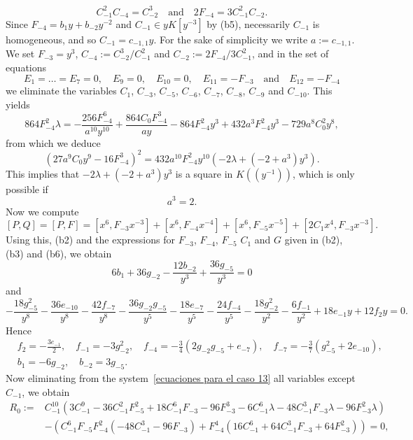 \documentclass[reqno,a4paper]{amsart}
\theoremstyle{definition}
\theoremstyle{remark}
\begin{document}
$$
C_{-1}^2 C_{-4} = C_{-2}^3\quad\text{and}\quad 2 F_{-4} = 3 C_{-1}^2 C_{-2}.
$$
%
Since $F_{-4}= b_1 y + b_{-2} y^{-2}$ and $C_{-1}\in yK[y^{-3}]$ by (b5), necessarily
$C_{-1}$ is homogeneous, and so $C_{-1}=c_{-1,1} y$. For the sake of simplicity we
write $a:=c_{-1,1}$. We set $F_{-3}=y^3$,  $C_{-4} := C_{-2}^3/C_{-1}^2$  and
$C_{-2} := 2 F_{-4}/3 C_{-1}^2$, and in the set of equations
$$
E_1=\dots=E_7 = 0,\quad E_9 = 0,\quad E_{10} = 0,\quad E_{11}=-F_{-3}\quad\text{and}\quad E_{12}=-F_{-4}
$$
we eliminate the variables $C_{1}$, $C_{-3}$, $C_{-5}$, $C_{-6}$, $C_{-7}$, $C_{-8}$,
$C_{-9}$ and $C_{-10}$. This yields
$$
864 F_{-4}^2 \lambda = -\frac{256 F_{-4}^6}{a^{10} y^{10}} +
\frac{864 C_0 F_{-4}^3}{a y} - 864 F_{-4}^2 y^3 + 432 a^3 F_{-4}^2 y^3 - 729 a^8 C_0^2 y^8,
$$
from which we deduce
$$
(27 a^9 C_0 y^9 - 16 F_{-4}^3)^2=432 a^{10} F_{-4}^2 y^{10} (-2 \lambda + (-2 + a^3) y^3).
$$
This implies that $-2 \lambda + (-2 + a^3) y^3$ is a square in $K((y^{-1}))$, which is only possible if
\begin{equation}\label{para a3}
a^3=2.
\end{equation}
Now we compute
$$
[P,Q]=[P,F]=[x^6,F_{-3} x^{-3}]+[x^6,F_{-4} x^{-4}]+[x^6,F_{-5} x^{-5}]+[2 C_1 x^4,F_{-3} x^{-3}].
$$
Using this, (b2) and the expressions for $F_{-3}$, $F_{-4}$, $F_{-5}$ $C_1$ and
$G$ given in (b2), (b3) and (b6), we obtain
$$
6 b_1 + 36 g_{-2} - \frac{12 b_{-2}}{y^3} + \frac{36 g_{-5}}{y^3}=0
$$
and
$$
-\frac{18 g_{-5}^2}{y^8} - \frac{36 e_{-10}}{y^8} - \frac{42 f_{-7}}{y^8} -
\frac{36 g_{-2} g_{-5}}{y^5} - \frac{ 18 e_{-7}}{y^5} - \frac{24 f_{-4}}{y^5} -
\frac{18 g_{-2}^2}{y^2} - \frac{6 f_{-1}}{y^2} + 18 e_{-1} y + 12 f_2 y=0.
$$
Hence
\begin{align*}
&f_2 = -\frac{3 e_{-1}}{ 2},\quad f_{-1} = -3 g_{-2}^2,\quad  f_{-4} =
-\frac 34 (2 g_{-2} g_{-5} + e_{-7}),\quad f_{-7} = -\frac 37 (g_{-5}^2 + 2 e_{-10}),\\
&b_1 = -6 g_{-2},\quad b_{-2} = 3 g_{-5}.
\end{align*}
Now eliminating from the system~\eqref{ecuaciones para el caso 13} all variables except $C_{-1}$, we obtain
\begin{align*}
R_0 :=& C_{-1}^{10} (3 C_{-1}^9 - 36 C_{-1}^2 F_{-5}^2 + 18 C_{-1}^6 F_{-3} -
96 F_{-3}^3 - 6 C_{-1}^6 \lambda - 48 C_{-1}^3 F_{-3} \lambda -
      96 F_{-3}^2 \lambda)\\
& - (C_{-1}^6 F_{-5} F_{-4}^2 (-48 C_{-1}^3 - 96 F_{-3}) + F_{-4}^4 (16 C_{-1}^6
+ 64 C_{-1}^3 F_{-3} + 64 F_{-3}^2))=0,
\end{align*}
\end{document}
